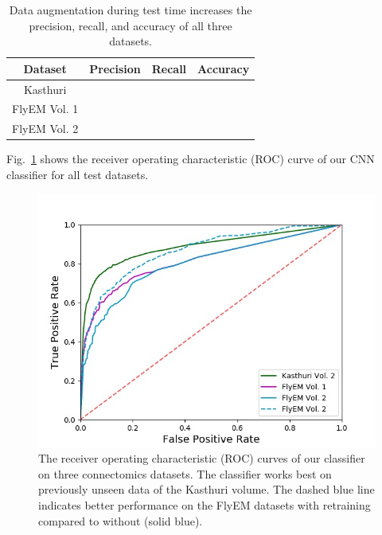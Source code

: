 \begin{table}
	\begin{center}
		\begin{tabular}{c | c c c}
			Dataset & Precision & Recall & Accuracy \\ \hline
			Kasthuri & & & \\
			FlyEM Vol. 1 & & & \\
			FlyEM Vol. 2 & & & 
		\end{tabular}
		\caption{Data augmentation during test time increases the precision, recall, and accuracy of all three datasets.}
		\label{table:inference-augmentation}
	\end{center}
\end{table}

Fig.~\ref{fig:receiver-operating-characteristic} shows the receiver operating characteristic (ROC) curve of our CNN classifier for all test datasets.

\begin{figure}
	\centering
	\includegraphics[width=0.45\linewidth]{./figures/receiver-operating-characteristic.jpg}
	\caption{The receiver operating characteristic (ROC) curves of our classifier on three connectomics datasets. The classifier works best on previously unseen data of the Kasthuri volume. The dashed blue line indicates better performance on the FlyEM datasets with retraining compared to without (solid blue).}
	\label{fig:receiver-operating-characteristic}
\end{figure}

